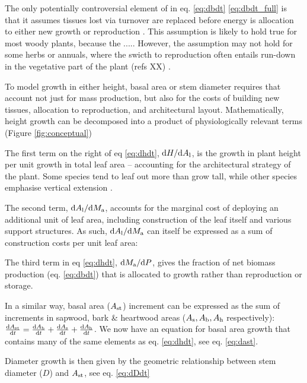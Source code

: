 \documentclass[a4paper,11pt]{article}
\begin{document}
The only potentially controversial element of in eq. \ref{eq:dbdt} \ref{eq:dbdt_full} is that it assumes tissues lost via turnover are replaced before energy is allocation to either new growth or reproduction \citep{Thornley-2000}. This assumption is likely to hold true for most woody plants, because the ..... However, the assumption may not hold for some herbs or annuals, where the swicth to reproduction often entails run-down in the vegetative part of the plant (refs XX) \citep{ Thornley-2000}.

To model growth in either height, basal area or stem diameter requires that account not just for mass production, but also for the costs of building new tissues, allocation to reproduction, and architectural layout. Mathematically, height growth can be decomposed into a product of physiologically relevant terms \citep{Falster-2011, Gibert-2016} (Figure \ref{fig:conceptual})


The first term on the right of eq \ref{eq:dhdt},
${\rm d}H / {\rm d}A_{\rm l}$, is the growth in plant height
per unit growth in total leaf area -- accounting for the architectural
strategy of the plant. Some species tend to leaf out more than grow
tall, while other species emphasise vertical
extension \citep{Poorter-2006}.

The second term, ${\rm d}A_{\rm l} / {\rm d}M_{\rm a}$,
accounts for the marginal cost of deploying an additional unit of leaf
area, including construction of the leaf itself and various support
structures. As such, ${\rm d}A_{\rm l} / {\rm d}M_{\rm a}$
can itself be expressed as a sum of construction costs per unit leaf
area:

The third term in eq \ref{eq:dhdt},
${\rm d}M_{\rm a} / {\rm d}P$, gives the fraction of net
biomass production (eq. \ref{eq:dbdt}) that is allocated to growth
rather than reproduction or storage.

In a similar way, basal area ($A_{\rm st}$) increment can be
expressed as the sum of increments in sapwood, bark \& heartwood areas
($A_{\rm s}, A_{\rm b}, A_{\rm h}$ respectively):
$\frac{{\rm d}A_{\rm st}}{{\rm d}t}= \frac{{\rm d}A_{\rm b}}{{\rm d}t} + \frac{{\rm d}A_{\rm s}}{{\rm d}t} + \frac{{\rm d}A_{\rm h}}{{\rm d}t}$.
We now have an equation for basal area growth that contains many of the same
elements as eq. \ref{eq:dhdt}, see eq. \ref{eq:dast}.

Diameter growth is then given by the geometric relationship between stem
diameter ($D$) and $A_{\rm st}$, see eq. \ref{eq:dDdt}
\end{document}
